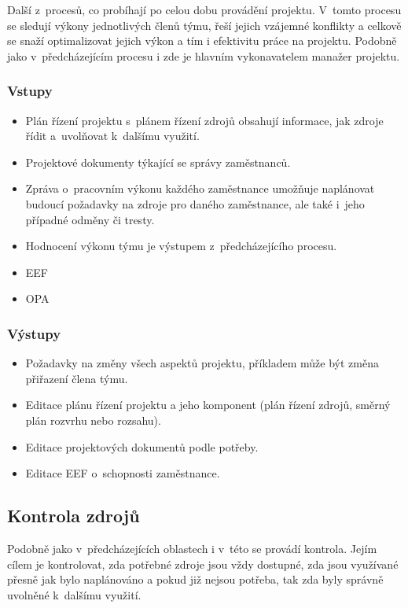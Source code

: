Další z~procesů, co probíhají po celou dobu provádění projektu. V~tomto procesu se sledují výkony jednotlivých členů týmu, řeší jejich vzájemné konflikty a celkově se snaží optimalizovat jejich výkon a tím i efektivitu práce na projektu. Podobně jako v~předcházejícím procesu i zde je hlavním vykonavatelem manažer projektu.

\subsubsection*{Vstupy}
\begin{itemize}
    \item Plán řízení projektu s~plánem řízení zdrojů obsahují informace, jak zdroje řídit a~uvolňovat k~dalšímu využití.
    \item Projektové dokumenty týkající se správy zaměstnanců.
    \item Zpráva o~pracovním výkonu každého zaměstnance umožňuje naplánovat budoucí požadavky na zdroje pro daného zaměstnance, ale také i~jeho případné odměny či tresty.
    \item Hodnocení výkonu týmu je výstupem z~předcházejícího procesu.
    \item EEF
    \item OPA
\end{itemize}
\subsubsection*{Výstupy}
\begin{itemize}
    \item Požadavky na změny všech aspektů projektu, příkladem může být změna přiřazení člena týmu.
    \item Editace plánu řízení projektu a jeho komponent (plán řízení zdrojů, směrný plán rozvrhu nebo rozsahu). 
    \item Editace projektových dokumentů podle potřeby. 
    \item Editace EEF o~schopnosti zaměstnance.
\end{itemize}

\subsection*{Kontrola zdrojů}

Podobně jako v~předcházejících oblastech i v~této se provádí kontrola. Jejím cílem je kontrolovat, zda potřebné zdroje jsou vždy dostupné, zda jsou využívané přesně jak bylo naplánováno a pokud již nejsou potřeba, tak zda byly správně uvolněné k~dalšímu využití.

